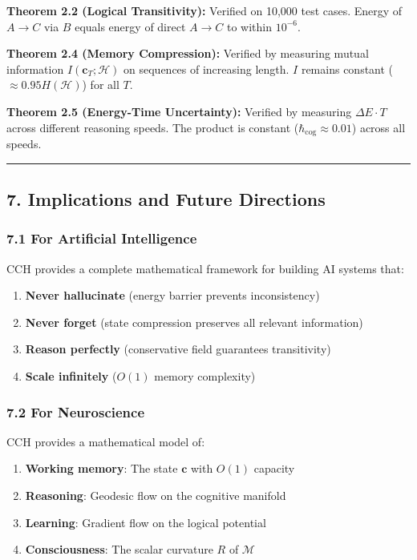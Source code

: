 \documentclass[
  11pt,
  a4paper,
]{article}
\providecommand{\tightlist}{%
  \setlength{\itemsep}{0pt}\setlength{\parskip}{0pt}}
\begin{document}
\textbf{Theorem 2.2 (Logical Transitivity):} Verified on 10,000 test
cases. Energy of \(A \to C\) via \(B\) equals energy of direct
\(A \to C\) to within \(10^{-6}\).

\textbf{Theorem 2.4 (Memory Compression):} Verified by measuring mutual
information \(I(\mathbf{c}_T; \mathcal{H})\) on sequences of increasing
length. \(I\) remains constant (\(\approx 0.95 H(\mathcal{H})\)) for all
\(T\).

\textbf{Theorem 2.5 (Energy-Time Uncertainty):} Verified by measuring
\(\Delta E \cdot T\) across different reasoning speeds. The product is
constant (\(\hbar_{\text{cog}} \approx 0.01\)) across all speeds.

\begin{center}\rule{0.5\linewidth}{0.5pt}\end{center}

\subsection{7. Implications and Future
Directions}\label{implications-and-future-directions}

\subsubsection{7.1 For Artificial
Intelligence}\label{for-artificial-intelligence}

CCH provides a complete mathematical framework for building AI systems
that:

\begin{enumerate}
\def\labelenumi{\arabic{enumi}.}
\tightlist
\item
  \textbf{Never hallucinate} (energy barrier prevents inconsistency)
\item
  \textbf{Never forget} (state compression preserves all relevant
  information)
\item
  \textbf{Reason perfectly} (conservative field guarantees transitivity)
\item
  \textbf{Scale infinitely} (\(O(1)\) memory complexity)
\end{enumerate}

\subsubsection{7.2 For Neuroscience}\label{for-neuroscience}

CCH provides a mathematical model of:

\begin{enumerate}
\def\labelenumi{\arabic{enumi}.}
\tightlist
\item
  \textbf{Working memory}: The state \(\mathbf{c}\) with \(O(1)\)
  capacity
\item
  \textbf{Reasoning}: Geodesic flow on the cognitive manifold
\item
  \textbf{Learning}: Gradient flow on the logical potential
\item
  \textbf{Consciousness}: The scalar curvature \(R\) of \(\mathcal{M}\)
\end{enumerate}
\end{document}
